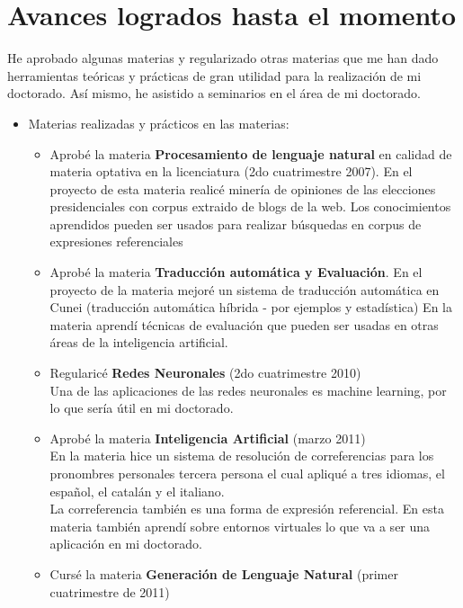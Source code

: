 \section{Avances logrados hasta el momento}
\label{progreso}

He aprobado algunas materias y regularizado otras materias que me han dado herramientas te\'oricas y pr\'acticas de gran utilidad para la realizaci\'on de mi doctorado. As\'i mismo, he asistido a seminarios en el \'area de mi doctorado.

\begin{itemize}

\item Materias realizadas y pr\'acticos en las materias:\\

\begin{itemize}
\item Aprob\'e la materia {\bf Procesamiento de lenguaje natural} en calidad de materia optativa en la licenciatura (2do cuatrimestre 2007). En el proyecto de esta materia realic\'e miner\'ia de opiniones de las elecciones presidenciales con corpus extraido de blogs de la web.
Los conocimientos aprendidos pueden ser usados para realizar b\'usquedas en corpus de expresiones referenciales
\item Aprob\'e la materia {\bf Traducci\'on autom\'atica y Evaluaci\'on}. En el proyecto de la materia mejor\'e un sistema de traducci\'on autom\'atica en Cunei (traducci\'on autom\'atica híbrida - por ejemplos y estadística)
En la materia aprend\'i t\'ecnicas de evaluaci\'on que pueden ser usadas en otras \'areas de la inteligencia artificial.
\item Regularic\'e {\bf Redes Neuronales} (2do cuatrimestre 2010)\\
Una de las aplicaciones de las redes neuronales es machine learning, por lo que ser\'ia \'util en mi doctorado.
\item Aprob\'e la materia {\bf Inteligencia Artificial} (marzo 2011)\\
En la materia hice un sistema de resoluci\'on de correferencias para los pronombres personales tercera persona el cual apliqu\'e a tres idiomas, el espa\~{n}ol, el catal\'an y el italiano.\\
La correferencia tambi\'en es una forma de expresi\'on referencial. En esta materia tambi\'en aprend\'i sobre entornos virtuales lo que va a ser una aplicaci\'on en mi doctorado.
\item Curs\'e la materia {\bf Generaci\'on de Lenguaje Natural} (primer cuatrimestre de 2011)\\

\end{itemize}
\end{itemize}
